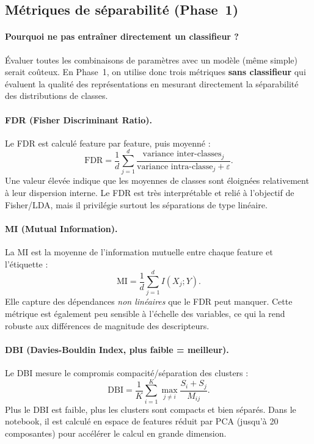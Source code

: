 \documentclass[12pt,a4paper]{article}
\begin{document}
    \subsection{Métriques de séparabilité (Phase~1)}
    \paragraph{Pourquoi ne pas entraîner directement un classifieur ?}
    Évaluer toutes les combinaisons de paramètres avec un modèle (même simple) serait coûteux.
    En Phase~1, on utilise donc trois métriques \textbf{sans classifieur} qui évaluent la qualité des représentations en mesurant directement la séparabilité des distributions de classes.

    \paragraph{FDR (Fisher Discriminant Ratio).}
    Le FDR est calculé feature par feature, puis moyenné :
    \[
    \mathrm{FDR}=\frac{1}{d}\sum_{j=1}^{d}
    \frac{\text{variance inter-classes}_j}{\text{variance intra-classe}_j+\varepsilon}.
    \]
    Une valeur élevée indique que les moyennes de classes sont éloignées relativement à leur dispersion interne.
    Le FDR est très interprétable et relié à l’objectif de Fisher/LDA, mais il privilégie surtout les séparations de type linéaire.

    \paragraph{MI (Mutual Information).}
    La MI est la moyenne de l’information mutuelle entre chaque feature et l’étiquette :
    \[
    \mathrm{MI}=\frac{1}{d}\sum_{j=1}^{d} I(X_j;Y).
    \]
    Elle capture des dépendances \textit{non linéaires} que le FDR peut manquer.
    Cette métrique est également peu sensible à l’échelle des variables, ce qui la rend robuste aux différences de magnitude des descripteurs.

    \paragraph{DBI (Davies-Bouldin Index, plus faible = meilleur).}
    Le DBI mesure le compromis compacité/séparation des clusters :
    \[
    \mathrm{DBI}=\frac{1}{K}\sum_{i=1}^{K}\max_{j\neq i}\frac{S_i+S_j}{M_{ij}}.
    \]
    Plus le DBI est faible, plus les clusters sont compacts et bien séparés.
    Dans le notebook, il est calculé en espace de features réduit par PCA (jusqu’à 20 composantes) pour accélérer le calcul en grande dimension.
\end{document}
